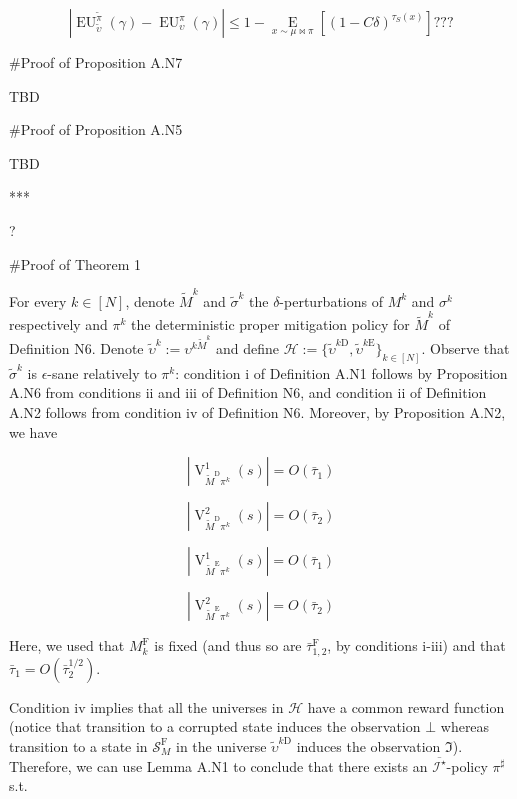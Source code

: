 \documentclass[a4paper]{article}
\newcommand{\AP}[1]{\left(#1\right)}
\newcommand{\AB}[1]{\left[#1\right]}
\newcommand{\Ea}[2]{\underset{#1}{\operatorname{E}}\AB{#2}}
\newcommand{\Abs}[1]{\left\vert #1 \right\vert}
\newcommand{\St}{\mathcal{S}}
\newcommand{\In}{\mathcal{I}}
\newcommand{\Hy}{\mathcal{H}}
\newcommand{\RMD}{\mathrm{D}}
\newcommand{\RME}{\mathrm{E}}
\newcommand{\RMF}{\mathrm{F}}
\newcommand{\SF}{\St^{\RMF}}
\newcommand{\V}{\operatorname{V}}
\newcommand{\EU}{\operatorname{EU}}
\begin{document}
$$\Abs{\EU_{\tilde{\upsilon}}^{\tilde{\pi}}(\gamma)-\EU_{\upsilon}^{\pi}(\gamma)} \leq 1-\Ea{x\sim\mu\bowtie\pi}{\AP{1-C\delta}^{\tau_S(x)}}???$$

\#Proof of Proposition A.N7


TBD

\#Proof of Proposition A.N5


TBD

***

?

\#Proof of Theorem 1

For every $k \in [N]$, denote $\tilde{M}^k$ and $\tilde{\sigma}^k$ the $\delta$-perturbations of $M^k$ and $\sigma^k$ respectively and $\pi^k$ the deterministic proper mitigation policy for $\tilde{M}^k$ of Definition N6. Denote $\tilde{\upsilon}^k:=\upsilon^{k\tilde{M}^k}$ and define $\Hy:=\{\tilde{\upsilon}^{k\RMD},\tilde{\upsilon}^{k\RME}\}_{k \in [N]}$. Observe that $\tilde{\sigma}^{k}$ is $\epsilon$-sane relatively to $\pi^k$: condition i of Definition A.N1 follows by Proposition A.N6 from conditions ii and iii of Definition N6, and condition ii of Definition A.N2 follows from condition iv of Definition N6. Moreover, by Proposition A.N2, we have

$$\Abs{\V_{\tilde{M}^\RMD\pi^k}^1(s)} = O\AP{\bar{\tau}_1}$$

$$\Abs{\V_{\tilde{M}^\RMD\pi^k}^2(s)} = O\AP{\bar{\tau}_2}$$

$$\Abs{\V_{\tilde{M}^\RME\pi^k}^1(s)} = O\AP{\bar{\tau}_1}$$

$$\Abs{\V_{\tilde{M}^\RME\pi^k}^2(s)} = O\AP{\bar{\tau}_2}$$

Here, we used that $M^\RMF_k$ is fixed (and thus so are $\bar{\tau}_{1,2}^\RMF$, by conditions i-iii) and that $\bar{\tau}_1 = O\AP{\bar{\tau}_2^{1/2}}$.

Condition iv implies that all the universes in $\Hy$ have a common reward function (notice that transition to a corrupted state induces the observation $\bot$ whereas transition to a state in $\SF_M$ in the universe $\tilde{\upsilon}^{k\RMD}$ induces the observation $\Im$). Therefore, we can use Lemma A.N1 to conclude that there exists an $\overline{\In^\star}$-policy $\pi^\sharp$ s.t.
\end{document}
